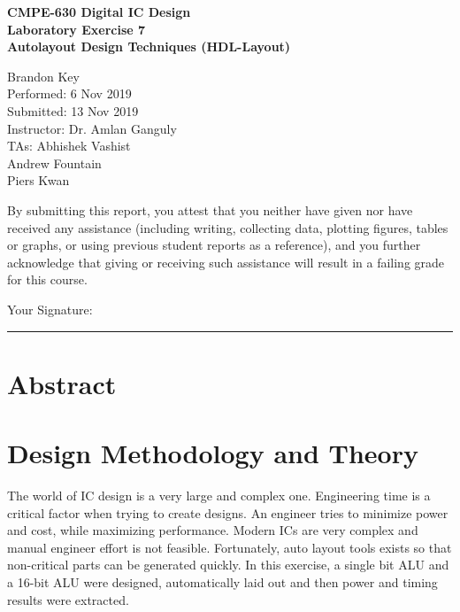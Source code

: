 \documentclass[11pt]{article}
\begin{document}
%
%

\vspace*{2 cm}

\begin{center}
\bf{CMPE-630 Digital IC Design\\
    Laboratory Exercise 7\\
\vspace{0.25 cm}
Autolayout Design Techniques (HDL-Layout)
}
\end{center}

\vspace{6 cm}

\begin{flushright}
Brandon Key\\
Performed: 6 Nov 2019\\
Submitted: 13 Nov 2019\\
\vspace{0.5 cm}
Instructor: Dr. Amlan Ganguly\\
TAs: Abhishek Vashist\\
Andrew Fountain\\
Piers Kwan\\
\vspace{0.5 cm}
\end{flushright}

\vspace{3 cm}
\indent By submitting this report, you attest that you neither have given nor have received any assistance (including writing, collecting data, plotting figures, tables or graphs, or using previous student reports as a reference), and you further acknowledge that giving or receiving such assistance will result in a failing grade for this course.

\vspace{1 cm}
Your Signature:   \rule{13cm}{.1pt}


\newpage

\section{Abstract}
	

\section{Design Methodology and Theory}

	The world of IC design is a very large and complex one. Engineering time is a critical factor when trying to create designs. An engineer tries to minimize power and cost, while maximizing performance. Modern ICs are very complex and manual engineer effort is not feasible. Fortunately, auto layout tools exists so that non-critical parts can be generated quickly. In this exercise, a single bit ALU and a 16-bit ALU were designed, automatically laid out and then power and timing results were extracted. 
	
\end{document}
